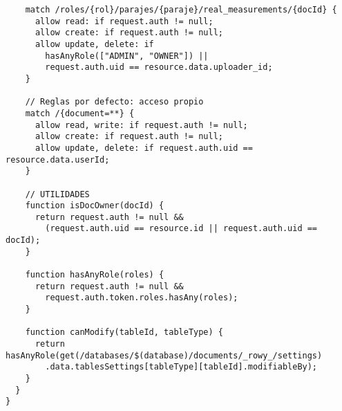\begin{verbatim}
    match /roles/{rol}/parajes/{paraje}/real_measurements/{docId} {
      allow read: if request.auth != null;
      allow create: if request.auth != null;
      allow update, delete: if 
        hasAnyRole(["ADMIN", "OWNER"]) || 
        request.auth.uid == resource.data.uploader_id;
    }

    // Reglas por defecto: acceso propio
    match /{document=**} {
      allow read, write: if request.auth != null;
      allow create: if request.auth != null;
      allow update, delete: if request.auth.uid == resource.data.userId;
    }

    // UTILIDADES
    function isDocOwner(docId) {
      return request.auth != null &&
        (request.auth.uid == resource.id || request.auth.uid == docId);
    }

    function hasAnyRole(roles) {
      return request.auth != null &&
        request.auth.token.roles.hasAny(roles);
    }

    function canModify(tableId, tableType) {
      return hasAnyRole(get(/databases/$(database)/documents/_rowy_/settings)
        .data.tablesSettings[tableType][tableId].modifiableBy);
    }
  }
}
\end{verbatim}











  





